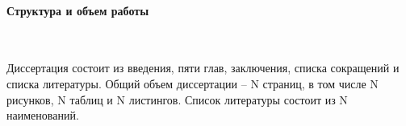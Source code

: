 \paragraph{Структура и объем работы} \

Диссертация состоит из введения, пяти глав, заключения, списка сокращений и списка литературы.
Общий объем диссертации -- N страниц, в том числе N рисунков, N таблиц и N листингов.
Список литературы состоит из N наименований.
